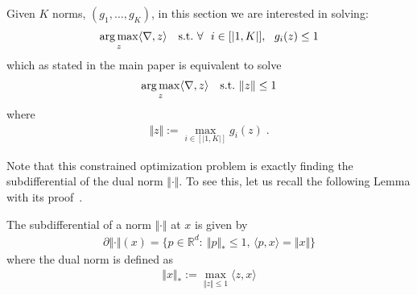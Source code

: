 Given $K$ norms, $(g_1,\dots, g_K)$, in this section we are interested in solving:
\begin{align}
\label{eq:multi-norm-opt-convex-app}
 \operatorname*{arg\,max}_{z} \langle \nabla, z\rangle\quad \text{s.t.}~\forall~~i\in [|1,K|],~~g_i(z)\leq 1
\end{align}
which as stated in the main paper is equivalent to solve
\begin{align*}
 \operatorname*{arg\,max}_{z} \langle \nabla, z\rangle\quad \text{s.t.}~\Vert z\Vert\leq 1
\end{align*}
where
\begin{align}
\label{eq:def-gen-norm}
\Vert z\Vert := \max_{i\in[|1,K|]}g_i(z)\; .
\end{align}

Note that this constrained optimization problem is exactly finding the subdifferential of the dual norm $\Vert \cdot \Vert$. To see this, let us recall the following Lemma with its proof~\cite{watson1992characterization}.
\begin{lemma}
The subdifferential of a norm $\Vert \cdot \Vert$ at $x$ is given by
\begin{align*}
    \partial\Vert \cdot\Vert(x)=\{p\in\mathbb{R}^d:~\Vert p\Vert_*\leq 1\text{, } \langle p, x\rangle = \Vert x\Vert\}
\end{align*}
where the dual norm is defined as
\begin{align*}
    \Vert x\Vert_*:=\max_{\Vert z\Vert\leq 1}\langle z, x\rangle 
\end{align*}
\end{lemma}

